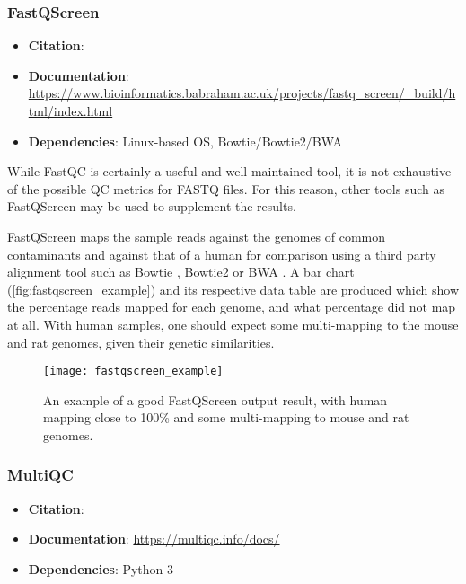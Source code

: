 \subsubsection{FastQScreen}
\begin{itemize}\itemsep-0.5em
\item[] \textbf{Citation}: 				\cite{wingett2018fastq}
\item[] \textbf{Documentation}: 	\url{https://www.bioinformatics.babraham.ac.uk/projects/fastq_screen/_build/html/index.html}
\item[] \textbf{Dependencies}: Linux-based OS, Bowtie/Bowtie2/BWA
\end{itemize}

While FastQC is certainly a useful and well-maintained tool, it is not exhaustive of the possible QC metrics for FASTQ files. For this reason, other tools such as FastQScreen may be used to supplement the results.

FastQScreen maps the sample reads against the genomes of common contaminants and against that of a human for comparison using a third party alignment tool such as Bowtie \citep{bowtie}, Bowtie2 \citep{bowtie2} or BWA \citep{bwa}. A bar chart (\autoref{fig:fastqscreen_example}) and its respective data table are produced which show the percentage reads mapped for each genome, and what percentage did not map at all. With human samples, one should expect some multi-mapping to the mouse and rat genomes, given their genetic similarities.

\begin{figure}[!ht]
    \centering
    \texttt{[image: fastqscreen\_example]}
    \caption[FastQScreen plot example]{An example of a good FastQScreen output result, with human mapping close to 100\% and some multi-mapping to mouse and rat genomes. } 
    \label{fig:fastqscreen_example}
\end{figure}

\subsubsection{MultiQC}

\begin{itemize}\itemsep-0.5em
\item[] \textbf{Citation}: 				\cite{multiqc}
\item[] \textbf{Documentation}: 	\url{https://multiqc.info/docs/}
\item[] \textbf{Dependencies}:  Python 3
\end{itemize}

